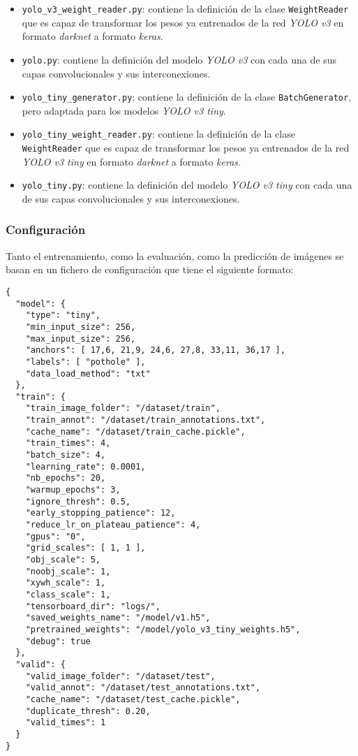 \begin{itemize}
	\item \texttt{yolo\_v3\_weight\_reader.py}: contiene la definición de la clase \texttt{WeightReader}  que es capaz de transformar los pesos ya entrenados de la red \textit{YOLO v3} en formato \textit{darknet} a formato \textit{keras}.
	\item \texttt{yolo.py}:  contiene la definición del modelo \textit{YOLO v3} con cada una de sus capas convolucionales y sus interconexiones.
	\item \texttt{yolo\_tiny\_generator.py}: contiene la definición de la clase \texttt{BatchGenerator}, pero adaptada para los modelos \textit{YOLO v3 tiny}.
	\item \texttt{yolo\_tiny\_weight\_reader.py}: contiene la definición de la clase \texttt{WeightReader}  que es capaz de transformar los pesos ya entrenados de la red \textit{YOLO v3 tiny} en formato \textit{darknet} a formato \textit{keras}.
	\item \texttt{yolo\_tiny.py}: contiene la definición del modelo \textit{YOLO v3 tiny} con cada una de sus capas convolucionales y sus interconexiones.
\end{itemize}

\subsubsection*{Configuración}

Tanto el entrenamiento, como la evaluación, como la predicción de imágenes se basan en un fichero de configuración que tiene el siguiente formato:

\begin{lstlisting}[frame=single, basicstyle=\ttfamily\footnotesize, caption={Configuración de ejemplo}, captionpos=b]
{
  "model": {
    "type": "tiny",
    "min_input_size": 256,
    "max_input_size": 256,
    "anchors": [ 17,6, 21,9, 24,6, 27,8, 33,11, 36,17 ],
    "labels": [ "pothole" ],
    "data_load_method": "txt"
  },
  "train": {
    "train_image_folder": "/dataset/train",
    "train_annot": "/dataset/train_annotations.txt",
    "cache_name": "/dataset/train_cache.pickle",
    "train_times": 4,
    "batch_size": 4,
    "learning_rate": 0.0001,
    "nb_epochs": 20,
    "warmup_epochs": 3,
    "ignore_thresh": 0.5,
    "early_stopping_patience": 12,
    "reduce_lr_on_plateau_patience": 4,
    "gpus": "0",
    "grid_scales": [ 1, 1 ],
    "obj_scale": 5,
    "noobj_scale": 1,
    "xywh_scale": 1,
    "class_scale": 1,
    "tensorboard_dir": "logs/",
    "saved_weights_name": "/model/v1.h5",
    "pretrained_weights": "/model/yolo_v3_tiny_weights.h5",
    "debug": true
  },
  "valid": {
    "valid_image_folder": "/dataset/test",
    "valid_annot": "/dataset/test_annotations.txt",
    "cache_name": "/dataset/test_cache.pickle",
    "duplicate_thresh": 0.20,
    "valid_times": 1
  }
}
\end{lstlisting}

